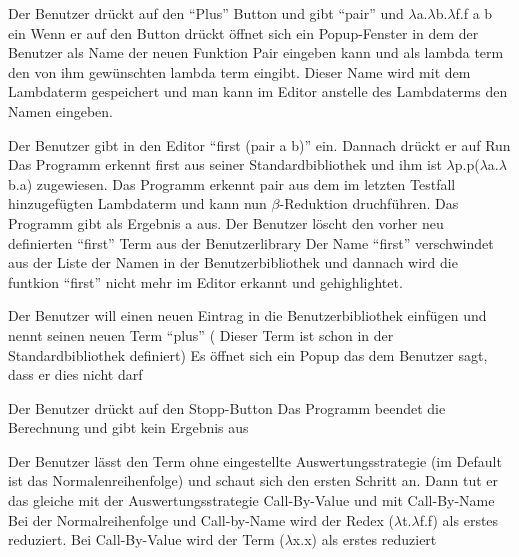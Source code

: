 \documentclass[parskip=full,11pt,twoside]{scrartcl}
\begin{document}
{ Der Benutzer drückt auf den \enquote {Plus} Button und gibt \enquote {pair} und $\lambda$a.$\lambda$b.$\lambda$f.f a b ein }
{Wenn er auf den Button drückt öffnet sich ein Popup-Fenster in dem der Benutzer als Name der neuen Funktion Pair eingeben kann und als lambda term den von ihm gewünschten lambda term eingibt. Dieser Name wird mit dem Lambdaterm gespeichert und man kann im Editor anstelle des Lambdaterms den Namen eingeben. }

{ Der Benutzer gibt in den Editor \enquote {first (pair a b)} ein. Dannach drückt er auf Run}
{ Das Programm erkennt first aus seiner Standardbibliothek und ihm ist $\lambda$p.p($\lambda$a.$\lambda$b.a) zugewiesen. Das Programm erkennt pair aus dem im letzten Testfall hinzugefügten Lambdaterm und kann nun $\beta$-Reduktion druchführen. Das Programm gibt als Ergebnis a aus.}
{Der Benutzer löscht den vorher neu definierten \enquote{first} Term aus der Benutzerlibrary}
{Der Name \enquote{first} verschwindet aus der Liste der Namen in der Benutzerbibliothek und dannach wird die funtkion \enquote{first} nicht mehr im Editor erkannt und gehighlightet.}

{Der Benutzer will einen neuen Eintrag in die Benutzerbibliothek einfügen und nennt seinen neuen Term \enquote{plus} ( Dieser Term ist schon in der Standardbibliothek definiert) }
{Es öffnet sich ein Popup das dem Benutzer sagt, dass er dies nicht darf}

{Der Benutzer drückt auf den Stopp-Button}
{ Das Programm beendet die Berechnung und gibt kein Ergebnis aus }



{Der Benutzer lässt den Term ohne eingestellte Auswertungsstrategie (im Default ist das Normalenreihenfolge) und schaut sich den ersten Schritt an. Dann tut er das gleiche mit der Auswertungsstrategie Call-By-Value und  mit Call-By-Name}
{ Bei der Normalreihenfolge und Call-by-Name wird der Redex ($\lambda$t.$\lambda$f.f) als erstes reduziert. Bei Call-By-Value wird der Term ($\lambda$x.x) als erstes reduziert }
\end{document}
